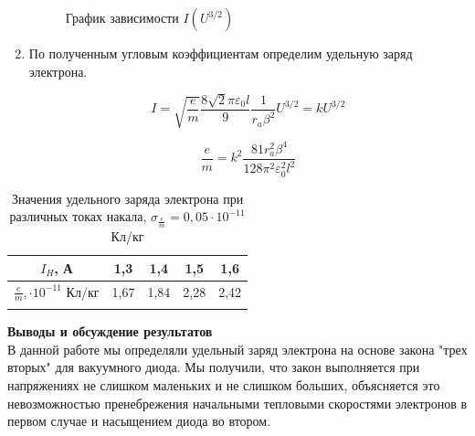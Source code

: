 \documentclass[a4paper, 12pt]{article}%
\begin{document}
\begin{enumerate}
	\begin{figure}[H]
		\caption{График зависимости $I (U^{3/2})$}
	\end{figure}
	
	
	
	\item По полученным угловым коэффициентам определим удельную заряд электрона.
	
	$$ I = \sqrt{\dfrac{e}{m}} \dfrac{8\sqrt{2}\pi \varepsilon_0 l}{9}\dfrac{1}{r_a\beta^2} U^{3/2} = kU^{3/2}$$
	
	$$ \dfrac{e}{m} = k^2 \frac{81r_a^2\beta^4}{128\pi^2\varepsilon_0^2l^2} $$
	
	
	\end{enumerate}
	
	\begin{longtable} {|c|c|c|c|c|}
		\hline
		$I_H$,  А& 1,3 & 1,4 & 1,5 & 1,6   \\ \hline
		$ \frac{e}{m}, \cdot 10^{-11}$ Кл/кг & 1,67 & 1,84 & 2,28 & 2,42 \\ \hline
		\caption{Значения удельного заряда электрона при различных токах накала, $\sigma_{\frac{e}{m}} = 0,05 \cdot 10^{-11}$ Кл/кг}
	\end{longtable}
	
	
	\newpage
	
	\textbf{Выводы и обсуждение результатов}\\
	
	В данной работе мы определяли удельный заряд электрона на основе закона "трех вторых" для вакуумного диода. Мы получили, что закон выполняется при напряжениях не слишком маленьких и не слишком больших, объясняется это невозможностью пренебрежения начальными тепловыми скоростями электронов в первом случае и насыщением диода во втором. 
	
\end{document}
